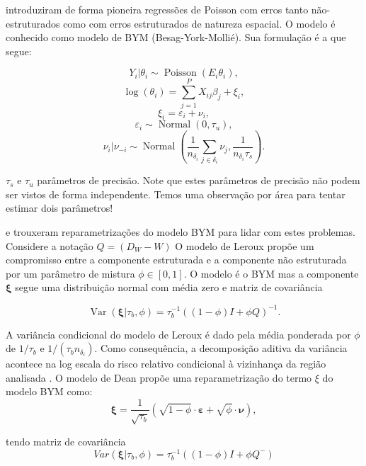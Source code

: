\textcite{Besag1991} introduziram de forma pioneira regressões de Poisson com erros tanto não-estruturados como com erros estruturados de natureza espacial.
O modelo é conhecido como modelo de BYM (Besag-York-Mollié).
Sua formulação é a que segue:

\begin{equation}
    \label{eq: bym}
        Y_i|\theta_i \sim \operatorname{Poisson}(E_i \theta_i),
\end{equation}
\[\log(\theta_i) = \sum_{j=1}^P X_{ij}\beta_j + \xi_i,\]
\[\xi_i = \varepsilon_i + \nu_i,\]
\[\varepsilon_i \sim \operatorname{Normal}(0,\tau_u),\]
\[\nu_i | \nu_{-i} \sim \operatorname{Normal}\left(\frac{1}{n_{\delta_i}}\sum_{j \in \delta_i} \nu_j, \frac{1}{n_{\delta_i} \tau_s}\right).\]

$\tau_s$ e $\tau_u$ parâmetros de precisão.
Note que estes parâmetros de precisão não podem ser vistos de forma independente.
Temos uma observação por área para tentar estimar dois parâmetros! 


\cite{Leroux} e \cite{Dean} trouxeram reparametrizações do modelo BYM para lidar com estes problemas.
Considere a notação $Q = (D_W - W)$ O modelo de Leroux propõe um compromisso entre a componente estruturada e a componente não estruturada por um parâmetro de mistura $\phi \in [0,1]$. O modelo é o BYM mas a componente $\boldsymbol{\xi}$ segue uma distribuição normal com média zero e matriz de covariância

\begin{equation}
\label{eq:leroux}
    \operatorname{Var}(\boldsymbol{\xi}|\tau_b, \phi) = \tau_b^{-1} \left((1-\phi)I + \phi Q  \right)^{-1}.
\end{equation}

A variância condicional do modelo de Leroux é dado pela média ponderada por $\phi$ de $1/\tau_b$ e $1/(\tau_bn_{\delta_i})$.
Como consequência, a decomposição aditiva da variância acontece na log escala do risco relativo condicional à vizinhança da região analisada \cite{Leroux}. O modelo de Dean propõe uma reparametrização do termo $\xi$ do modelo BYM como:
\begin{equation}
\label{eq:dean}
\boldsymbol{\xi} = \frac{1}{\sqrt{\tau_b}}\left( \sqrt{1-\phi}\cdot \boldsymbol{\varepsilon} + \sqrt{\phi} \cdot  \boldsymbol{\nu} \right),
\end{equation}

tendo matriz de covariância
\begin{equation}
    \label{eq:var_dean}
    Var(\boldsymbol{\xi}|\tau_b, \phi) = \tau_b^{-1}\left((1-\phi)I + \phi Q^- \right)
\end{equation}

